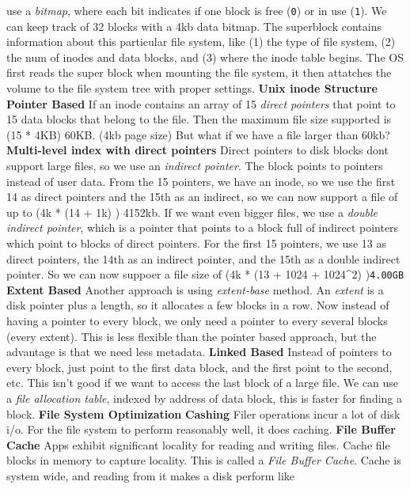 use a \emph{bitmap}, where each bit indicates if one block is free
(\texttt{0}) or in use (\texttt{1}). We can keep track of 32 blocks with
a 4kb data bitmap.
The superblock contains information about this particular file system, like (1) the type of file system,
(2) the num of inodes and data blocks, and (3) where the inode table begins.
The OS first reads the super block when mounting the file system, it
then attatches the volume to the file system tree with proper settings.
{\bf Unix inode Structure}
{\bf Pointer Based}
If an inode contains an array of 15 \emph{direct pointers} that point to
15 data blocks that belong to the file. Then the maximum file size
supported is (15 * 4KB) 60KB. (4kb page size)
But what if we have a file larger than 60kb?
{\bf Multi-level index with direct
pointers}
Direct pointers to disk blocks dont support large files, so we use an
\emph{indirect pointer}. The block points to pointers instead of user
data.
From the 15 pointers, we have an inode, so we use the first 14 as direct
pointers and the 15th as an indirect, so we can now support a file of up
to (4k * (14 + 1k) ) 4152kb.
If we want even bigger files, we use a \emph{double indirect pointer},
which is a pointer that points to a block full of indirect pointers
which point to blocks of direct pointers.
For the first 15 pointers, we use 13 as direct pointers, the 14th as an
indirect pointer, and the 15th as a double indirect pointer. So we can
now suppoer a file size of (4k * (13 + 1024 + 1024\^{}2)
)\texttt{4.00GB}
{\bf Extent Based}
Another approach is using \emph{extent-base} method. An \emph{extent} is
a disk pointer plus a length, so it allocates a few blocks in a row. Now
instead of having a pointer to every block, we only need a pointer to
every several blocks (every extent). This is less flexible than the
pointer based approach, but the advantage is that we need less metadata.
{\bf Linked Based}
Instead of pointers to every block, just point to the first data block,
and the first point to the second, etc. This isn't good if we want to
access the last block of a large file.
We can use a \emph{file allocation table}, indexed by address of data
block, this is faster for finding a block.
{\bf File System Optimization}
{\bf Cashing}
Filer operations incur a lot of disk i/o. For the file system to perform
reasonably well, it does caching.
{\bf File Buffer Cache}
Apps exhibit significant locality for reading and writing files. Cache
file blocks in memory to capture locality. This is called a \emph{File
Buffer Cache}.
Cache is system wide, and reading from it makes a disk perform like
